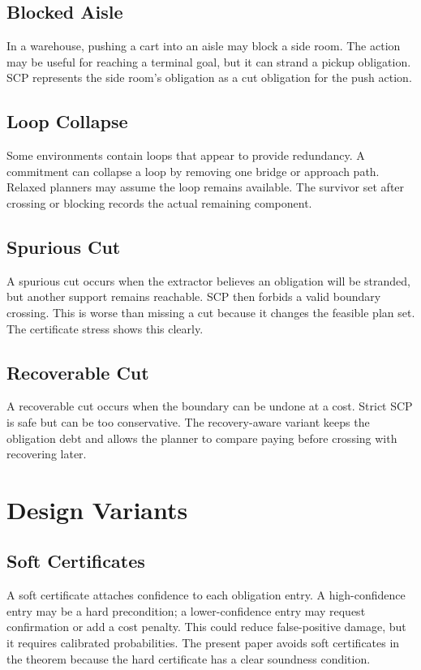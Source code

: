 \documentclass{article}
\begin{document}
\subsection{Blocked Aisle}

In a warehouse, pushing a cart into an aisle may block a side room. The action may be useful for reaching a terminal goal, but it can strand a pickup obligation. SCP represents the side room's obligation as a cut obligation for the push action.

\subsection{Loop Collapse}

Some environments contain loops that appear to provide redundancy. A commitment can collapse a loop by removing one bridge or approach path. Relaxed planners may assume the loop remains available. The survivor set after crossing or blocking records the actual remaining component.

\subsection{Spurious Cut}

A spurious cut occurs when the extractor believes an obligation will be stranded, but another support remains reachable. SCP then forbids a valid boundary crossing. This is worse than missing a cut because it changes the feasible plan set. The certificate stress shows this clearly.

\subsection{Recoverable Cut}

A recoverable cut occurs when the boundary can be undone at a cost. Strict SCP is safe but can be too conservative. The recovery-aware variant keeps the obligation debt and allows the planner to compare paying before crossing with recovering later.

\section{Design Variants}

\subsection{Soft Certificates}

A soft certificate attaches confidence to each obligation entry. A high-confidence entry may be a hard precondition; a lower-confidence entry may request confirmation or add a cost penalty. This could reduce false-positive damage, but it requires calibrated probabilities. The present paper avoids soft certificates in the theorem because the hard certificate has a clear soundness condition.
\end{document}
